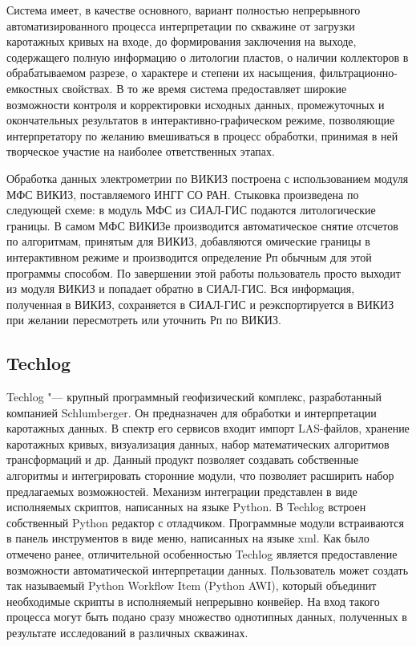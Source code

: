 Система имеет, в качестве основного, вариант полностью непрерывного
автоматизированного процесса интерпретации по скважине от загрузки
каротажных кривых на входе, до формирования заключения на выходе,
содержащего полную информацию о литологии пластов, о наличии коллекторов в
обрабатываемом разрезе, о характере и степени их насыщения,
фильтрационно-емкостных свойствах. В то же время система предоставляет
широкие возможности контроля и корректировки исходных данных, промежуточных
и окончательных результатов в интерактивно-графическом режиме, позволяющие
интерпретатору по желанию вмешиваться в процесс обработки, принимая в ней
творческое участие на наиболее ответственных этапах.

Обработка данных электрометрии по ВИКИЗ построена с использованием модуля
МФС ВИКИЗ, поставляемого ИНГГ СО РАН. Стыковка произведена по следующей
схеме: в модуль МФС из СИАЛ-ГИС подаются литологические границы. В самом
МФС ВИКИЗе производится автоматическое снятие отсчетов по алгоритмам,
принятым для ВИКИЗ, добавляются омические границы в интерактивном режиме и
производится определение Рп обычным для этой программы способом. По
завершении этой работы пользователь просто выходит из модуля ВИКИЗ и
попадает обратно в СИАЛ-ГИС. Вся информация, полученная в ВИКИЗ,
сохраняется в СИАЛ-ГИС и реэкспортируется в ВИКИЗ при желании пересмотреть
или уточнить Рп по ВИКИЗ.

\subsection{Techlog} \label{subsect_Techlog}
Techlog "--- крупный программный геофизический комплекс, разработанный
компанией Schlumberger. Он предназначен для обработки и интерпретации
каротажных данных. В спектр его сервисов входит импорт LAS-файлов, хранение
каротажных кривых, визуализация данных, набор математических алгоритмов
трансформаций и др. Данный продукт позволяет создавать собственные
алгоритмы и интегрировать сторонние модули, что позволяет расширить набор
предлагаемых возможностей. Механизм интеграции представлен в виде
исполняемых скриптов, написанных на языке Python. В Techlog встроен
собственный Python редактор с отладчиком. Программные модули встраиваются в
панель инструментов в виде меню, написанных на языке xml. Как было отмечено
ранее, отличительной особенностью Techlog является предоставление
возможности автоматической интерпретации данных. Пользователь может создать
так называемый Python Workflow Item (Python AWI), который объединит
необходимые скрипты в исполняемый непрерывно конвейер. На вход такого
процесса могут быть подано сразу множество однотипных данных, полученных в
результате исследований в различных скважинах.

